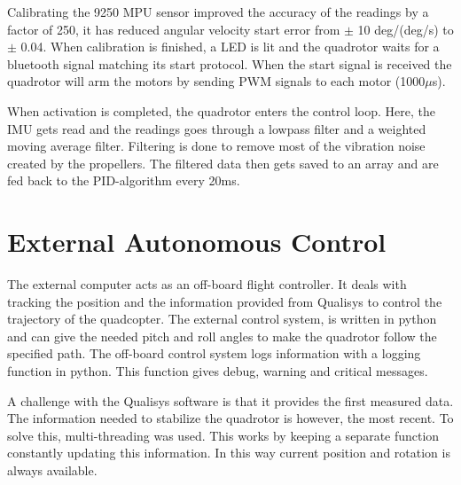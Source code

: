 Calibrating the 9250 MPU sensor improved the accuracy of the readings by a factor of 250, it has reduced angular velocity start error from $\pm$ 10 deg/(deg/s) to $\pm$ 0.04. When calibration is finished, a LED is lit and the quadrotor waits for a bluetooth signal matching its start protocol. 
When the start signal is received the quadrotor will arm the motors by sending PWM signals to each motor (1000$\mu$s).\bigskip

When activation is completed, the quadrotor enters the control loop. Here, the IMU gets read and the readings goes through a lowpass filter and a weighted moving average filter. Filtering is done to remove most of the vibration noise created by the propellers. The filtered data then gets saved to an array and are fed back to the PID-algorithm every 20ms. 




\section{External Autonomous Control}

The external computer acts as an off-board flight controller. It deals with tracking the position and the information provided from Qualisys to control the trajectory of the quadcopter. The external control system, is written in python and can give the needed pitch and roll angles to make the quadrotor follow the specified path. The off-board control system logs information with a logging function in python. This function gives debug, warning and critical messages. \bigskip  

A challenge with the Qualisys software is that it provides the first measured data. The information needed to stabilize the quadrotor is however, the most recent. To solve this, multi-threading was used. This works by keeping a separate function constantly updating this information. In this way current position and rotation is always available. \bigskip


